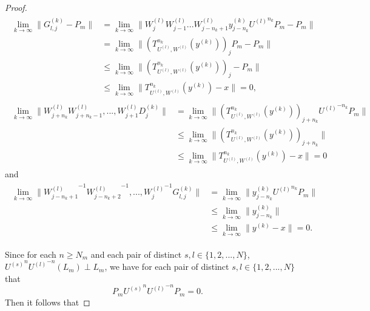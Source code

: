 \documentclass{article}
\begin{document}
\begin{proof}
\begin{eqnarray}\begin{split}\nonumber
\lim_{k\rightarrow\infty}\|G^{(k)}_{l,j}-P_{m}\|
&=\lim_{k\rightarrow\infty}\|W^{(l)}_{j}W^{(l)}_{j-1}...W^{(l)}_{j-n_{k}+1}y^{(k)}_{j-n_{k}}{U^{(l)}}^{n_{k}}P_{m}-P_{m}\|\\
&=\lim_{k\rightarrow\infty}\|\left(T^{n_{k}}_{U^{(l)},W^{(l)}}(y^{(k)})\right)_{j}P_{m}-P_{m}\|\\
&\leq \lim_{k\rightarrow\infty}\|\left(T^{n_{k}}_{U^{(l)},W^{(l)}}(y^{(k)})\right)_{j}-P_{m}\|\\
&\leq \lim_{k\rightarrow\infty}\|T^{n_{k}}_{U^{(l)},W^{(l)}}(y^{(k)})-x\|=0,
\end{split}\end{eqnarray}
\begin{eqnarray}\begin{split}\nonumber
\lim_{k\rightarrow\infty}\|W^{(l)}_{j+n_{k}}W^{(l)}_{j+n_{k}-1},...,W^{(l)}_{j+1}D^{(k)}_{j}\|&= \lim_{k\rightarrow\infty}\|\left(T^{n_{k}}_{U^{(l)},W^{(l)}}(y^{(k)})\right)_{j+n_{k}}{U^{(l)}}^{-n_{k}}P_{m}\| \\ &\leq\lim_{k\rightarrow\infty}\|\left(T^{n_{k}}_{U^{(l)},W^{(l)}}(y^{(k)})\right)_{j+n_{k}}\|\\
&\leq \lim_{k\rightarrow\infty}\|T^{n_{k}}_{U^{(l)},W^{(l)}}(y^{(k)})-x\|=0
\end{split}\end{eqnarray}
and
\begin{eqnarray}\begin{split}\nonumber
\lim_{k\rightarrow\infty}\|{W^{(l)}_{j-n_{k}+1}}^{-1}{W^{(l)}_{j-n_{k}+2}}^{-1},...,{W^{(l)}_{j}}^{-1}G^{(k)}_{l,j}\|
&=\lim_{k\rightarrow\infty}\|y^{(k)}_{j-n_{k}}{U^{(l)}}^{n_{k}}P_{m}\|\\
&\leq\lim_{k\rightarrow\infty}\|y^{(k)}_{j-n_{k}}\|\\
&\leq \lim_{k\rightarrow\infty}\|y^{(k)}-x\|=0.
\end{split}\end{eqnarray}

Since for each $n\geq N_{m}$ and each pair of distinct $s,l\in \{1,2,...,N\}$,  ${U^{(s)}}^{n}{U^{(l)}}^{-n}(L_{m})\perp L_{m}$, we have  for each pair of distinct $s,l\in \{1,2,...,N\}$ that
\[P_{m}{U^{(s)}}^{n}{U^{(l)}}^{-n}P_{m}=0.\]
Then it follows that



\end{proof}
\end{document}

